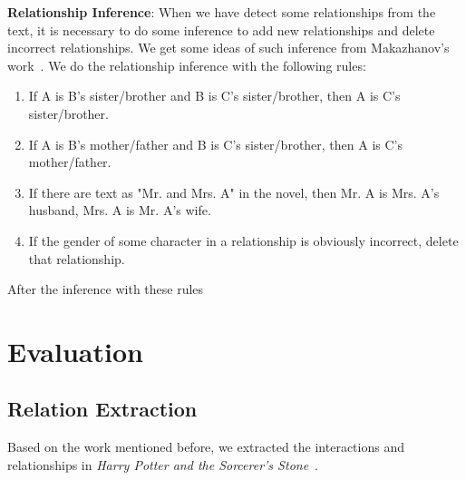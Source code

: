 \documentclass[11pt]{article}
\begin{document}
{\bf Relationship Inference}: When we have detect some relationships from the text, it is necessary to do some inference to add new relationships and delete incorrect relationships. We get some ideas of such inference from Makazhanov’s work~\cite{Makazhanov2014ExtractingFR}. We do the relationship inference with the following rules:
\begin{enumerate}
    \item If A is B's sister/brother and B is C's sister/brother, then A is C's sister/brother.
    \item If A is B's mother/father and B is C's sister/brother, then A is C's mother/father.
    \item If there are text as "Mr. and Mrs. A" in the novel, then Mr. A is Mrs. A's husband, Mrs. A is Mr. A's wife.
    \item If the gender of some character in a relationship is obviously incorrect, delete that relationship.
\end{enumerate}

After the inference with these rules




\section{Evaluation} %
\subsection{Relation Extraction}
    Based on the work mentioned before, we extracted the interactions and relationships in \textit{Harry Potter and the Sorcerer's Stone}~\cite{harrypotter}.
    
\end{document}
